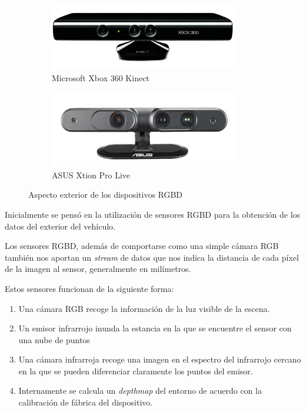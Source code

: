 \begin{figure}[h!]
    \begin{subfigure}[c]{.5\textwidth}
        \centering
        \includegraphics[width=0.9\textwidth]{img/xboxkinect.jpg}
        \caption{Microsoft Xbox 360 Kinect}
    \end{subfigure}%
    \begin{subfigure}[c]{.5\textwidth}
        \centering
        \includegraphics[width=0.9\textwidth]{img/xtionprolive.jpeg}
        \caption{ASUS Xtion Pro Live} 
    \end{subfigure}
    \caption{Aspecto exterior de los dispositivos RGBD}
    \label{fig:dispositivosRGBD}
\end{figure}


Inicialmente se pensó en la utilización de sensores RGBD para la obtención de los datos del exterior del vehículo.

Los sensores RGBD, además de comportarse como una simple cámara RGB también nos aportan un \textit{stream} de datos que nos indica la distancia de cada píxel de la imagen al sensor, generalmente en milímetros.

Estos sensores funcionan de la siguiente forma:

\begin{enumerate}
    \item Una cámara RGB recoge la información de la luz visible de la escena.
    \item Un emisor infrarrojo inunda la estancia en la que se encuentre el sensor con una nube de puntos
    \item Una cámara infrarroja recoge una imagen en el espectro del infrarrojo cercano en la que se pueden diferenciar claramente los puntos del emisor.
    \item Internamente se calcula un \textit{depthmap} del entorno de acuerdo con la calibración de fábrica del dispositivo.
\end{enumerate}

